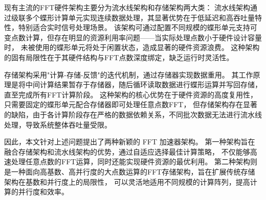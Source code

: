 现有主流的FFT硬件架构主要分为流水线架构和存储架构两大类：
流水线架构通过级联多个蝶形计算单元实现连续数据处理，其显著优势在于低延迟和高吞吐量特性\cite{1023593323.nh}，特别适合实时信号处理场景。
该架构可通过配置不同规模的蝶形单元支持可变点数计算，但存在明显的资源利用率问题——当实际处理点数小于硬件设计容量时，
未被使用的蝶形单元将处于闲置状态，造成显著的硬件资源浪费\cite{5599896}。
这种架构的固有局限性在于其硬件结构与FFT点数深度绑定，缺乏运行时灵活性。

存储架构采用"计算-存储-反馈"的迭代机制，通过存储器实现数据重用\cite{liu2018high}。
其工作原理是将中间计算结果暂存于存储器，随后循环读取数据进行蝶形运算并写回存储，
直至完成所有FFT计算阶段。
这种架构的核心优势在于硬件资源的高度复用性，只需要固定的蝶形单元配合存储器即可处理任意点数FFT，
但存储架构存在显著的缺陷，由于各计算阶段存在严格的数据依赖关系，不同批次数据无法进行流水线处理，导致系统整体吞吐量受限。

因此，本文针对上述问题提出了两种新颖的 FFT 加速器架构。
第一种架构旨在融合存储架构和流水线架构的优势，通过自适应选择最佳计算策略，
不仅能够高速处理任意点数的FFT运算，同时还能实现硬件资源的最优利用。
第二种架构则是一种面向高基数、高并行度的大点数运算的FFT存储架构，旨在扩展传统存储架构在基数和并行度上的局限性，
可以灵活地适用不同规模的计算阵列，提高计算的并行度和效率。




